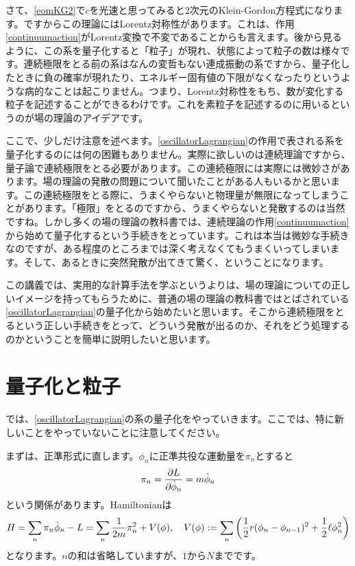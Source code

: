 \documentclass[report,paper=a4, fontsize=12pt, line_length=16cm, number_of_lines=33,dvipdfmx]{jlreq}
\numberwithin{equation}{chapter}
\begin{document}
さて、\eqref{eomKG2}で$c$を光速と思ってみると2次元のKlein-Gordon方程式になります。ですからこの理論にはLorentz対称性があります。これは、作用\eqref{continuumaction}がLorentz変換で不変であることからも言えます。後から見るように、この系を量子化すると「粒子」が現れ、状態によって粒子の数は様々です。連続極限をとる前の系はなんの変哲もない連成振動の系ですから、量子化したときに負の確率が現れたり、エネルギー固有値の下限がなくなったりというような病的なことは起こりません。つまり、Lorentz対称性をもち、数が変化する粒子を記述することができるわけです。これを素粒子を記述するのに用いるというのが場の理論のアイデアです。

ここで、少しだけ注意を述べます。\eqref{oscillatorLagrangian}の作用で表される系を量子化するのには何の困難もありません。実際に欲しいのは連続理論ですから、量子論で連続極限をとる必要があります。この連続極限には実際には微妙さがあります。場の理論の発散の問題について聞いたことがある人もいるかと思います。この連続極限をとる際に、うまくやらないと物理量が無限になってしまうことがあります。「極限」をとるのですから、うまくやらないと発散するのは当然ですね。しかし多くの場の理論の教科書では、連続理論の作用\eqref{continuumaction}から始めて量子化するという手続きをとっています。これは本当は微妙な手続きなのですが、ある程度のところまでは深く考えなくてもうまくいってしまいます。そして、あるときに突然発散が出てきて驚く、ということになります。

この講義では、実用的な計算手法を学ぶというよりは、場の理論についての正しいイメージを持ってもらうために、普通の場の理論の教科書ではとばされている\eqref{oscillatorLagrangian}の量子化から始めたいと思います。そこから連続極限をとるという正しい手続きをとって、どういう発散が出るのか、それをどう処理するのかということを簡単に説明したいと思います。

\section{量子化と粒子}
\label{sec:discretequantization}
では、\eqref{oscillatorLagrangian}の系の量子化をやっていきます。ここでは、特に新しいことをやっていないことに注意してください。

まずは、正準形式に直します。$\phi_n$に正準共役な運動量を$\pi_n$とすると
\begin{align}
  \pi_n=\pdv{L}{\dot{\phi}_n}=m\dot{\phi}_n
\end{align}
という関係があります。Hamiltonianは
\begin{align}
  H=\sum_{n}\pi_n \dot{\phi}_n-L=\sum_{n}\frac{1}{2m}\pi_n^2+V(\phi),\quad 
  V(\phi):=\sum_n\qty(\frac12 r (\phi_n-\phi_{n-1})^2
  +\frac12 \ell \phi_n^2
  )
\end{align}
となります。$n$の和は省略していますが、$1$から$N$までです。
\end{document}
